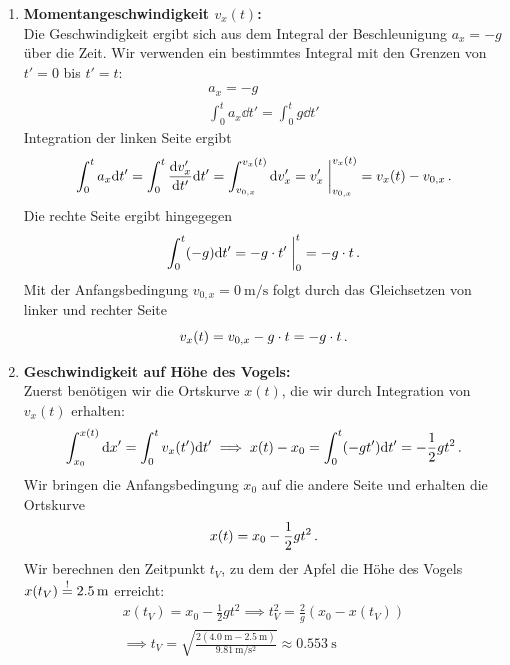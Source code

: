 \documentclass[ngerman]{scrreprt}
\newenvironment{loesungbox}[1]
  {\needspace{5\baselineskip}\begin{loesungboxstyle}[frametitle={#1}]}
  {\end{loesungboxstyle}}
\begin{document}
\begin{loesungbox}{Lösung zu \Cref{aufg:freier_fall}}
\begin{enumerate}
    \item \textbf{Momentangeschwindigkeit $v_x(t)$:} \\
    Die Geschwindigkeit ergibt sich aus dem Integral der Beschleunigung $a_x = -g$ über die Zeit. Wir verwenden ein bestimmtes Integral mit den Grenzen von $t'=0$ bis $t'=t$:
    \begin{equation}\begin{gathered}
        a_x = -g \\
        \int_{0}^{t} a_x \dd t' = \int_{0}^{t} g \dd t' 
    \end{gathered}\end{equation}
    Integration der linken Seite ergibt 
    \begin{equation}
        \int_{0}^{t} a_x \mathrm{d} t' = \int_{0}^{t} \frac{\mathrm{d} v'_x}{\mathrm{d} t'} \mathrm{d} t' = \int_{v_{0,x}}^{v_x(t)} \mathrm{d} v'_x = v'_x \; \bigg|_{v_{0,x}}^{v_x(t)} = v_x(t) - v_{0,x} \,.
    \end{equation}
    Die rechte Seite ergibt hingegegen 
    \begin{equation}
        \int_{0}^{t} (-g) \mathrm{d} t' = -g\cdot  t' \; \bigg|_{0}^{t} = -g\cdot  t \,.
    \end{equation}
    Mit der Anfangsbedingung $v_{0,x} = \SI{0}{\meter\per\second}$ folgt durch das Gleichsetzen von linker und rechter Seite 
    \begin{equation}\label{eq: freier_fall_v}
        v_x(t) = v_{0,x} - g\cdot t = -g\cdot  t \,.
    \end{equation}

    \item \textbf{Geschwindigkeit auf Höhe des Vogels:} \\
    Zuerst benötigen wir die Ortskurve $x(t)$, die wir durch Integration von $v_x(t)$ erhalten: 
    \begin{equation}
        \int_{x_0}^{x(t)} \mathrm{d} x' = \int_{0}^{t} v_x(t') \mathrm{d} t' \implies x(t) - x_0 = \int_{0}^{t} (-g t') \mathrm{d} t' = -\frac{1}{2}g t^2 \,.
    \end{equation}
    Wir bringen die Anfangsbedingung $x_0$ auf die andere Seite und erhalten die Ortskurve
    \begin{equation}\label{eq: freier_fall_x}
        x(t) = x_0 - \frac{1}{2}g t^2 \,.
    \end{equation}
    Wir berechnen den Zeitpunkt $t_V$, zu dem der Apfel die Höhe des Vogels $x(t_V) \stackrel{!}{=} \SI{2.5}{\meter}$ erreicht: 
    \begin{equation}\begin{aligned}
        x(t_V) = x_0 - \frac{1}{2}gt^2 \implies t_V^2 = \frac{2}{g}(x_0 - x(t_V)) \\
        \implies t_V = \sqrt{\frac{2(\SI{4.0}{\meter} - \SI{2.5}{\meter})}{\SI{9.81}{\meter\per\second\squared}}} \approx \SI{0.553}{\second}
    \end{aligned}\end{equation}
    

\end{enumerate}
\end{loesungbox}
\end{document}
